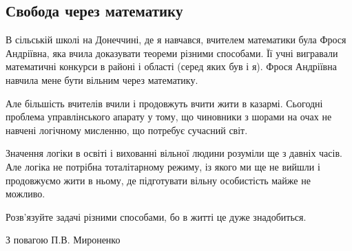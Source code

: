  
 
 
 
 

\subsection{Свобода через математику}
\label{sec:10_04_2021.fb.myronenko_petro.1.matematika_svoboda}

В сільській школі на Донеччині, де я навчався, вчителем математики була Фрося
Андріївна, яка вчила доказувати теореми різними способами. Її учні вигравали
математичні конкурси в районі і області (серед яких був і я). Фрося Андріївна
навчила мене бути вільним через математику. 

Але більшість вчителів вчили і продовжуть вчити жити в казармі. Сьогодні
проблема управлінського апарату у тому, що чиновники з шорами на очах не
навчені логічному мисленню, що потребує сучасний світ.

Значення логіки в освіті і вихованні вільної людини розуміли ще з давніх часів.
Але логіка не потрібна тоталітарному режиму, із якого ми ще не вийшли і
продовжуємо жити в ньому, де підготувати вільну особистість майже не можливо.

Розв'язуйте задачі різними способами, бо в житті це дуже знадобиться.

З повагою П.В. Мироненко
